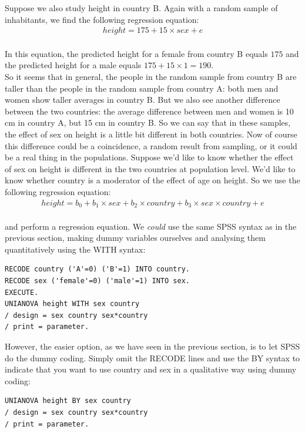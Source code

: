 \documentclass[]{report}\usepackage[]{graphicx}\usepackage[]{color}
\begin{document}
Suppose we also study height in country B. Again with a random sample of inhabitants, we find the following regression equation:
\\
\begin{eqnarray} 
height = 175 + 15  \times sex + e \nonumber
\end{eqnarray}
\\
In this equation, the predicted height for a female from country B equals $175$ and the predicted height for a male equals $175 + 15 \times 1 = 190$.\\

So it seems that in general, the people in the random sample from country B are taller than the people in the random sample from country A: both men and women show taller averages in country B. But we also see another difference between the two countries: the average difference between men and women is 10 cm in country A, but 15 cm in country B. So we can say that in these samples, the effect of sex on height is a little bit different in both countries. Now of course this difference could be a coincidence, a random result from sampling, or it could be a real thing in the populations. Suppose we'd like to know whether the effect of sex on height is different in the two countries at population level. We'd like to know whether country is a moderator of the effect of age on height. So we use the following regression equation:
\\
\begin{eqnarray} 
height = b_0 + b_1  \times sex + b_2 \times country +  b_3 \times sex \times country + e \nonumber
\end{eqnarray}
\\
and perform a regression equation. We \textit{could} use the same SPSS syntax as in the previous section, making dummy variables ourselves and analysing them quantitatively using the WITH syntax:
\begin{verbatim}
RECODE country ('A'=0) ('B'=1) INTO country.
RECODE sex ('female'=0) ('male'=1) INTO sex.
EXECUTE.
UNIANOVA height WITH sex country 
/ design = sex country sex*country
/ print = parameter.
\end{verbatim}

However, the easier option, as we have seen in the previous section, is to let SPSS do the dummy coding. Simply omit the RECODE lines and use the BY syntax to indicate that you want to use country and sex in a qualitative way using dummy coding:

\begin{verbatim}
UNIANOVA height BY sex country 
/ design = sex country sex*country
/ print = parameter.
\end{verbatim}
\end{document}
